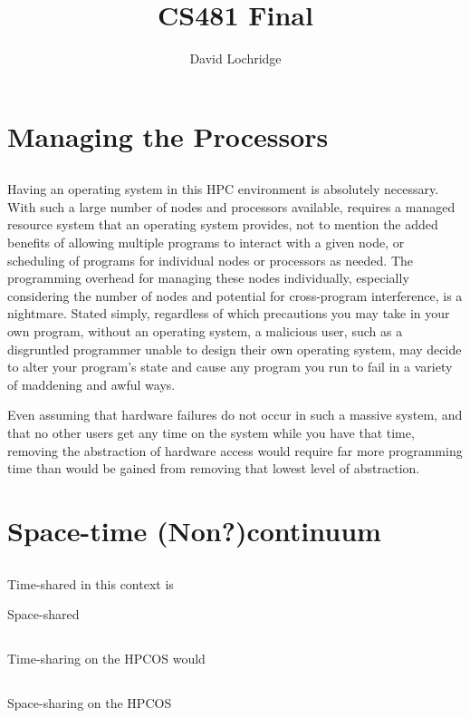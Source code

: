 \documentclass{article}
\title{CS481 Final}
\author{David Lochridge}
\begin{document}
\section{}
\section*{Managing the Processors}
\subsection{}
Having an operating system in this HPC environment is absolutely necessary. With such a large number of nodes and processors available, requires a managed resource system that an operating system provides, not to mention the added benefits of allowing multiple programs to interact with a given node, or scheduling of programs for individual nodes or processors as needed. The programming overhead for managing these nodes individually, especially considering the number of nodes and potential for cross-program interference, is a nightmare. Stated simply, regardless of which precautions you may take in your own program, without an operating system, a malicious user, such as a disgruntled programmer unable to design their own operating system, may decide to alter your program's state and cause any program you run to fail in a variety of maddening and awful ways.

Even assuming that hardware failures do not occur in such a massive system, and that no other users get any time on the system while you have that time, removing the abstraction of hardware access would require far more programming time than would be gained from removing that lowest level of abstraction.

\section*{Space-time (Non?)continuum}
\subsection{}
Time-shared in this context is 

Space-shared

\subsection{}
Time-sharing on the HPCOS would

\subsection{}
Space-sharing on the HPCOS
\end{document}
